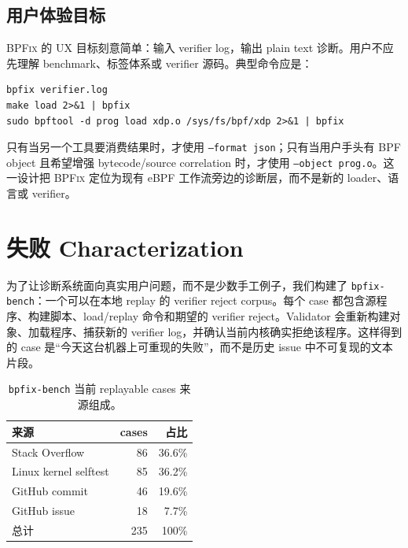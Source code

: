 \documentclass[letterpaper,twocolumn,10pt]{article}
\newcommand{\sys}{\textsc{BPFix}\xspace}
\newcommand{\code}[1]{\texttt{#1}}
\begin{document}
\subsection{用户体验目标}

\sys 的 UX 目标刻意简单：输入 verifier log，输出 plain text 诊断。用户不应先理解 benchmark、标签体系或 verifier 源码。典型命令应是：
\begin{lstlisting}[style=tinycode]
bpfix verifier.log
make load 2>&1 | bpfix
sudo bpftool -d prog load xdp.o /sys/fs/bpf/xdp 2>&1 | bpfix
\end{lstlisting}
只有当另一个工具要消费结果时，才使用 \code{--format json}；只有当用户手头有 BPF object 且希望增强 bytecode/source correlation 时，才使用 \code{--object prog.o}。这一设计把 \sys 定位为现有 eBPF 工作流旁边的诊断层，而不是新的 loader、语言或 verifier。

\section{失败 Characterization}
\label{sec:characterization}

为了让诊断系统面向真实用户问题，而不是少数手工例子，我们构建了 \code{bpfix-bench}：一个可以在本地 replay 的 verifier reject corpus。每个 case 都包含源程序、构建脚本、load/replay 命令和期望的 verifier reject。Validator 会重新构建对象、加载程序、捕获新的 verifier log，并确认当前内核确实拒绝该程序。这样得到的 case 是“今天这台机器上可重现的失败”，而不是历史 issue 中不可复现的文本片段。

\begin{table}[t]
\centering
\caption{\code{bpfix-bench} 当前 replayable cases 来源组成。}
\label{tab:bench-source}
\begin{tabular}{lrr}
\toprule
来源 & cases & 占比 \\
\midrule
Stack Overflow & 86 & 36.6\% \\
Linux kernel selftest & 85 & 36.2\% \\
GitHub commit & 46 & 19.6\% \\
GitHub issue & 18 & 7.7\% \\
\midrule
总计 & 235 & 100\% \\
\bottomrule
\end{tabular}
\end{table}
\end{document}
